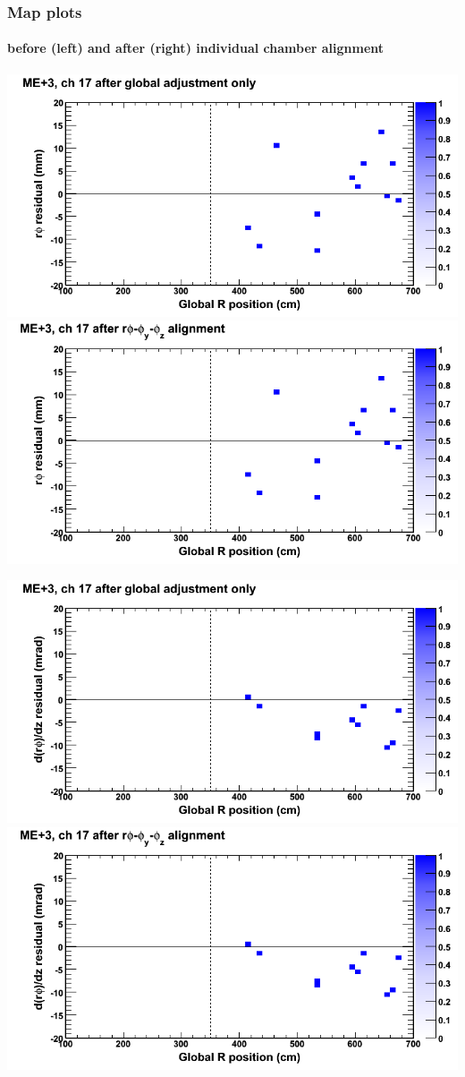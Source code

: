 \documentclass[compress]{beamer}
\begin{document}
\begin{frame}
\frametitle{Map plots}
\framesubtitle{before (left) and after (right) individual chamber alignment}
\includegraphics[width=0.5\linewidth]{ringmapplots_3dof/before_CSCvsr_mep3ch17_x.png} \includegraphics[width=0.5\linewidth]{ringmapplots_3dof/after_CSCvsr_mep3ch17_x.png}

\includegraphics[width=0.5\linewidth]{ringmapplots_3dof/before_CSCvsr_mep3ch17_dxdz.png} \includegraphics[width=0.5\linewidth]{ringmapplots_3dof/after_CSCvsr_mep3ch17_dxdz.png}
\end{frame}
\end{document}
